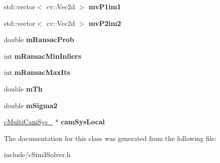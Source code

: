 \begin{DoxyCompactItemize}
\item 
std\+::vector$<$ cv\+::\+Vec2d $>$ {\bfseries mv\+P1im1}\hypertarget{classMultiColSLAM_1_1cSim3Solver_a174b5ca0f8e2bc12d1ec1ab4c2c717c4}{}\label{classMultiColSLAM_1_1cSim3Solver_a174b5ca0f8e2bc12d1ec1ab4c2c717c4}

\item 
std\+::vector$<$ cv\+::\+Vec2d $>$ {\bfseries mv\+P2im2}\hypertarget{classMultiColSLAM_1_1cSim3Solver_a7ae450aadaccab2af93a9790201f0f93}{}\label{classMultiColSLAM_1_1cSim3Solver_a7ae450aadaccab2af93a9790201f0f93}

\item 
double {\bfseries m\+Ransac\+Prob}\hypertarget{classMultiColSLAM_1_1cSim3Solver_a5e1106e8f4740a88b719655b46e9e8e4}{}\label{classMultiColSLAM_1_1cSim3Solver_a5e1106e8f4740a88b719655b46e9e8e4}

\item 
int {\bfseries m\+Ransac\+Min\+Inliers}\hypertarget{classMultiColSLAM_1_1cSim3Solver_a84bccc9eb447c56757edbe5190e3dd55}{}\label{classMultiColSLAM_1_1cSim3Solver_a84bccc9eb447c56757edbe5190e3dd55}

\item 
int {\bfseries m\+Ransac\+Max\+Its}\hypertarget{classMultiColSLAM_1_1cSim3Solver_a3f1c4554794933736cec99d8c0101d13}{}\label{classMultiColSLAM_1_1cSim3Solver_a3f1c4554794933736cec99d8c0101d13}

\item 
double {\bfseries m\+Th}\hypertarget{classMultiColSLAM_1_1cSim3Solver_afeb3b428fee73a6b79876a41d822cd04}{}\label{classMultiColSLAM_1_1cSim3Solver_afeb3b428fee73a6b79876a41d822cd04}

\item 
double {\bfseries m\+Sigma2}\hypertarget{classMultiColSLAM_1_1cSim3Solver_a5d0081f29b5a63b754d63ab6fd537688}{}\label{classMultiColSLAM_1_1cSim3Solver_a5d0081f29b5a63b754d63ab6fd537688}

\item 
\hyperlink{classMultiColSLAM_1_1cMultiCamSys__}{c\+Multi\+Cam\+Sys\+\_\+} $\ast$ {\bfseries cam\+Sys\+Local}\hypertarget{classMultiColSLAM_1_1cSim3Solver_aa6b6054be688ae0e21b05efc84b40025}{}\label{classMultiColSLAM_1_1cSim3Solver_aa6b6054be688ae0e21b05efc84b40025}

\end{DoxyCompactItemize}


The documentation for this class was generated from the following file\+:\begin{DoxyCompactItemize}
\item 
include/c\+Sim3\+Solver.\+h\end{DoxyCompactItemize}
